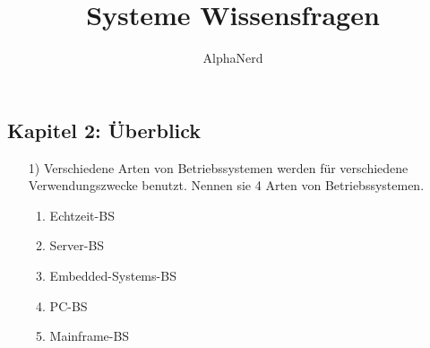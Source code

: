\documentclass[11pt,a4paper]{article}
\author{AlphaNerd}
\title{Systeme Wissensfragen}
\begin{document}
\maketitle


\subsection*{Kapitel 2: Überblick}
\begin{itemize}
\item[1)]
Verschiedene Arten von Betriebssystemen werden für verschiedene Verwendungszwecke benutzt. Nennen sie 4 Arten von Betriebssystemen.
\begin{enumerate}
\item Echtzeit-BS
\item Server-BS
\item Embedded-Systems-BS
\item PC-BS
\item Mainframe-BS
\end{enumerate}
\end{itemize}
\end{document}
